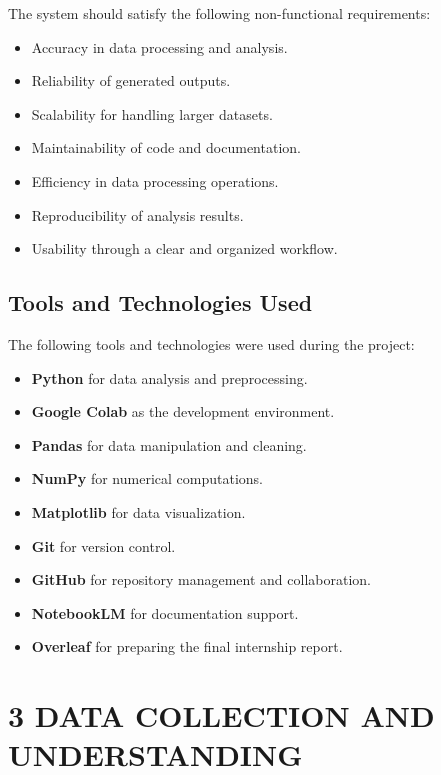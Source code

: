 \documentclass[12pt,a4paper]{report}
\begin{document}
The system should satisfy the following non-functional requirements:

\begin{itemize}
\item Accuracy in data processing and analysis.
\item Reliability of generated outputs.
\item Scalability for handling larger datasets.
\item Maintainability of code and documentation.
\item Efficiency in data processing operations.
\item Reproducibility of analysis results.
\item Usability through a clear and organized workflow.
\end{itemize}

\section{Tools and Technologies Used}

The following tools and technologies were used during the project:

\begin{itemize}
\item \textbf{Python} for data analysis and preprocessing.
\item \textbf{Google Colab} as the development environment.
\item \textbf{Pandas} for data manipulation and cleaning.
\item \textbf{NumPy} for numerical computations.
\item \textbf{Matplotlib} for data visualization.
\item \textbf{Git} for version control.
\item \textbf{GitHub} for repository management and collaboration.
\item \textbf{NotebookLM} for documentation support.
\item \textbf{Overleaf} for preparing the final internship report.
\end{itemize}


\setcounter{chapter}{3}
\setcounter{section}{0}
\renewcommand{\thesection}{3.\arabic{section}}

\chapter*{\color{ChapterBlue}3 DATA COLLECTION AND UNDERSTANDING}
\end{document}
